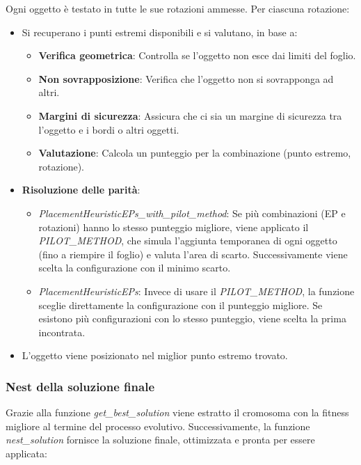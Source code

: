 Ogni oggetto è testato in tutte le sue rotazioni ammesse. Per ciascuna rotazione:
\begin{itemize}
    \item Si recuperano i punti estremi disponibili e si valutano, in base a:
    \begin{itemize}
        \item \textbf{Verifica geometrica}: Controlla se l'oggetto non esce dai limiti del foglio.
        \item \textbf{Non sovrapposizione}: Verifica che l'oggetto non si sovrapponga ad altri.
        \item \textbf{Margini di sicurezza}: Assicura che ci sia un margine di sicurezza tra l'oggetto e i bordi o altri oggetti.
        \item \textbf{Valutazione}: Calcola un punteggio per la combinazione (punto estremo, rotazione).
    \end{itemize}
    \item \textbf{Risoluzione delle parità}:
    \begin{itemize}
        \item \emph{PlacementHeuristicEPs\_with\_pilot\_method}: Se più combinazioni (EP e rotazioni) hanno lo stesso punteggio migliore, viene applicato il \emph{PILOT\_METHOD}, che simula l'aggiunta temporanea di ogni oggetto (fino a riempire il foglio) e valuta l'area di scarto. Successivamente viene scelta la configurazione con il minimo scarto.
        \item \emph{PlacementHeuristicEPs}: Invece di usare il \emph{PILOT\_METHOD}, la funzione sceglie direttamente la configurazione con il punteggio migliore. Se esistono più configurazioni con lo stesso punteggio, viene scelta la prima incontrata.
    \end{itemize}
    \item L'oggetto viene posizionato nel miglior punto estremo trovato.
\end{itemize}

\subsubsection*{Nest della soluzione finale}

Grazie alla funzione \emph{get\_best\_solution} viene estratto il cromosoma con la fitness migliore al termine del processo evolutivo. Successivamente, la funzione \emph{nest\_solution} fornisce la soluzione finale, ottimizzata e pronta per essere applicata:

